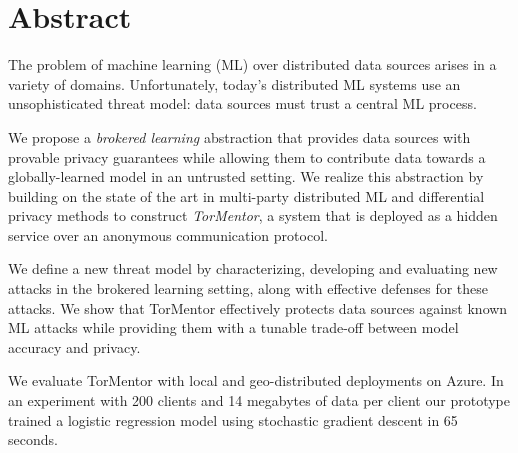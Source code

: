 \chapter{Abstract}

The problem of machine learning (ML) over distributed data sources
arises in a variety of domains. Unfortunately, today's distributed ML
systems use an unsophisticated threat model: data sources must trust a
central ML process.

We propose a \emph{brokered learning} abstraction that provides data
sources with provable privacy guarantees while allowing them to
contribute data towards a globally-learned model in an untrusted
setting. We realize this abstraction by building on the state of the
art in multi-party distributed ML and differential privacy methods to
construct \emph{TorMentor}, a system that is deployed as a hidden
service over an anonymous communication protocol.

We define a new threat model by characterizing, developing and
evaluating new attacks in the brokered learning setting, along with
effective defenses for these attacks. We show that TorMentor
effectively protects data sources against known ML attacks while
providing them with a tunable trade-off between model accuracy and
privacy.

We evaluate TorMentor with local and geo-distributed deployments on
Azure. In an experiment with 200 clients and 14 megabytes of data per
client our prototype trained a logistic regression model using
stochastic gradient descent in 65 seconds.







%


